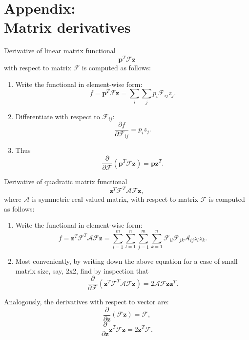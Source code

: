 
\newpage
\section{Appendix: \\ Matrix derivatives}
\label{sec:MDerivative}

Derivative of linear matrix functional $$\bm{p}^T \mathcal{F} \bm{z}$$
with respect to matrix $\mathcal{F}$
is computed as follows:
\begin{enumerate}
 \item Write the functional in element-wise form:
   $$ f = \bm{p}^T \mathcal{F} \bm{z} =
      \sum_i \sum_j p_i \mathcal{F}_{ij} z_j. $$
 \item Differentiate with respect to $\mathcal{F}_{ij}$:
    $$ \frac{\partial f}{\partial \mathcal{F}_{ij}} = p_i z_j. $$
 \item Thus $$ \frac{\partial}{\partial \mathcal{F}}
 (\bm{p}^T \mathcal{F} \bm{z}) = \bm{p} \bm{z}^T. $$
\end{enumerate}

Derivative of quadratic matrix functional
$$\bm{z}^T \mathcal{F}^T \mathcal{A} \mathcal{F} \bm{z},$$
where $\mathcal{A}$ is
symmetric real valued matrix, with respect to matrix $\mathcal{F}$ is computed
as follows:
\begin{enumerate}
 \item Write the functional in element-wise form:
		$$ f = \bm{z}^T \mathcal{F}^T \mathcal{AF} \bm{z} =
		\sum_{i=1}^m \sum_{l=1}^n \sum_{j=1}^m \sum_{k=1}^n
		\mathcal{F}_{il} \mathcal{F}_{jk} \mathcal{A}_{ij} z_l z_k. $$
 \item Most conveniently, by writing down the above equation for a case of
 small matrix size, say, 2x2, find by inspection that
		$$ \frac{\partial}{\partial \mathcal{F}}
		(\bm{z}^T \mathcal{F}^T \mathcal{AF} \bm{z}) = 2 \mathcal{AF} \bm{zz}^T. $$
\end{enumerate}

Analogously, the derivatives with respect to vector are:
$$ \frac{\partial}{\partial \bm{z}} ( \mathcal{F} \bm{z} ) = \mathcal{F}, $$
$$
	\frac{\partial}{\partial \bm{z}} \bm{z}^{T} \mathcal{F} \bm{z} =
	2 \bm{z}^{T} \mathcal{F}.
$$
